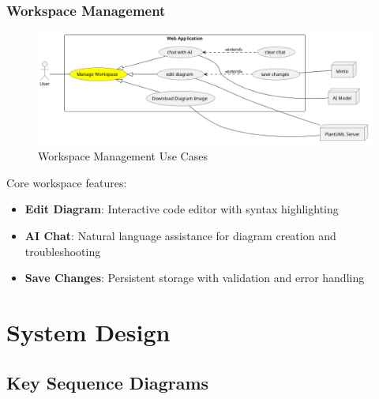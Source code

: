 \subsubsection{Workspace Management}
\begin{figure}[H]
\centering
\includegraphics[width=1\textwidth]{conception/SprintIV/use_case_diagrams/refined_use_case_feature_workspace_management.png}
\caption{Workspace Management Use Cases}
\end{figure}

Core workspace features:
\begin{itemize}
    \item \textbf{Edit Diagram}: Interactive code editor with syntax highlighting
    \item \textbf{AI Chat}: Natural language assistance for diagram creation and troubleshooting
    \item \textbf{Save Changes}: Persistent storage with validation and error handling
\end{itemize}

\section{System Design}


\subsection{Key Sequence Diagrams}

